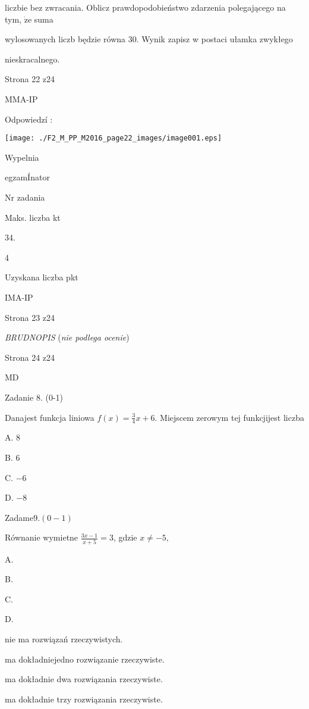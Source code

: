 \documentclass[a4paper,12pt]{article}
\begin{document}
liczbie bez zwracania. Oblicz prawdopodobieństwo zdarzenia polegającego na tym, $\dot{\mathrm{z}}\mathrm{e}$ suma

wylosowanych liczb będzie równa 30. Wynik zapisz w postaci ułamka zwykłego

nieskracalnego.

Strona 22 z24

MMA-IP





Odpowiedzí :
\begin{center}
\texttt{[image: ./F2\_M\_PP\_M2016\_page22\_images/image001.eps]}
\end{center}
Wypelnia

egzamÍnator

Nr zadania

Maks. liczba kt

34.

4

Uzyskana liczba pkt

IMA-IP

Strona 23 z24





{\it BRUDNOPIS} ({\it nie podlega ocenie})

Strona 24 z24

MD





Zadanie 8. (0-1)

Danajest funkcja liniowa $f(x)=\displaystyle \frac{3}{4}x+6$. Miejscem zerowym tej funkcjijest liczba

A. 8

B. 6

C. $-6$

D. $-8$

Zadam$\mathrm{e}9.(0-1)$

Równanie wymietne $\displaystyle \frac{3x-1}{x+5}=3$, gdzie $x\neq-5,$

A.

B.

C.

D.

nie ma rozwiązań rzeczywistych.

ma dokładniejedno rozwiązanie rzeczywiste.

ma dokładnie dwa rozwiązania rzeczywiste.

ma dokładnie trzy rozwiązania rzeczywiste.
\end{document}
